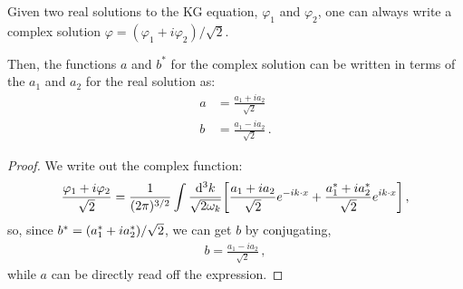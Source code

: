 \documentclass[main.tex]{subfiles}
\begin{document}
\begin{claim}
Given two real solutions to the KG equation, \(\varphi_{1}\) and \(\varphi_{2}\), one can always write a complex solution \(\varphi = (\varphi_{1} + i \varphi_{2}) / \sqrt{2}\). 

Then, the functions \(a\) and \(b^{*}\) for the complex solution can be written in terms of the \(a_{1}\) and \(a_2 \) for the real solution as: 
%
\begin{align}
a &=  \frac{ a_1 + i a_2 }{\sqrt{2}} \\
b &= \frac{a_1 - i a_2 }{\sqrt{2}}
\,.
\end{align}
\end{claim}

\begin{proof}
We write out the complex function: 
%
\begin{align}
\frac{\varphi_1 + i \varphi_2 }{\sqrt{2}} = 
\frac{1}{(2 \pi )^{3/2}} 
\int \frac{ \dd[3]{k}}{\sqrt{2 \omega_{k }}} \qty[
\frac{a_1 + i a_2 }{\sqrt{2}} e^{-i k \cdot x}
+  \frac{a_1^{*} + i a_2^{*}}{\sqrt{2}}
e^{i k \cdot x}]
\,,
\end{align}
%
so, since \(b^{*} = \qty(a_1^{*} + i a_2^{*}) / \sqrt{2}\), we can get \(b\) by conjugating, 
%
\begin{align}
b = \frac{a_1 - i a_2 }{\sqrt{2}}
\,,
\end{align}
%
while \(a\) can be directly read off the expression.
\end{proof}
\end{document}
